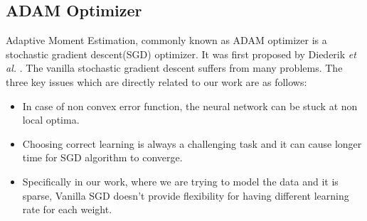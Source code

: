 \subsection{ADAM Optimizer}

Adaptive Moment Estimation, commonly known as ADAM optimizer is a stochastic gradient descent(SGD) optimizer. It was first proposed by Diederik \textit{et al.} \cite{Adam}. The vanilla stochastic gradient descent suffers from many problems. The three key issues which are directly related to our work are as follows:
\begin{itemize}
    \item In case of non convex error function, the neural network can be stuck at non local optima.
    \item Choosing correct learning is always a challenging task and it can cause longer time for SGD algorithm to converge.
    \item Specifically in our work, where we are trying to model the data and it is sparse, Vanilla SGD doesn't provide flexibility for having different learning rate for each weight.


\end{itemize}
